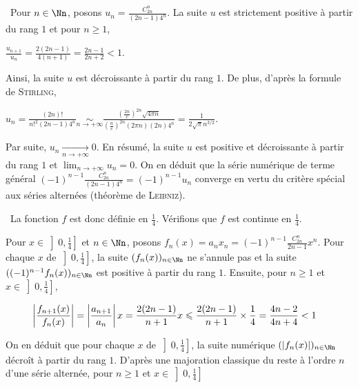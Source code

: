 {{\begin{center}
\shadowbox{
$\forall x\in\left]- \frac{1}{4}, \frac{1}{4}\right[$, $\sum_{n=0}^{+\infty}(-1)^n \frac{C_{2n}^n}{2n-1}x^n=\sqrt{1+4x}$.
}
\end{center}

\textbullet~Pour $n\in\Nn$, posons $u_n= \frac{C_{2n}^n}{(2n-1)4^n}$. La suite $u$ est strictement positive à partir du rang $1$ et pour $n\geqslant1$, 

\begin{center}
$ \frac{u_{n+1}}{u_n}= \frac{2(2n-1)}{4(n+1)}= \frac{2n-1}{2n+2}<1$.
\end{center}

Ainsi, la suite $u$ est décroissante à partir du rang $1$. De plus, d'après la formule de \textsc{Stirling},

\begin{center}
$u_n= \frac{(2n)!}{n!^2(2n-1)4^n}\underset{n\rightarrow+\infty}{\sim} \frac{\left( \frac{2n}{e}\right)^{2n}\sqrt{4\pi n}}{\left( \frac{n}{e}\right)^{2n}(2\pi n)(2n)4^n}= \frac{1}{2\sqrt{\pi}n^{3/2}}$.
\end{center}

Par suite, $u_n\underset{n\rightarrow+\infty}{\rightarrow}0$. En résumé, la suite $u$ est positive et décroissante à partir du rang $1$ et $\lim_{n \rightarrow +\infty}u_n=0$. On en déduit que la série numérique de terme général $(-1)^{n-1} \frac{C_{2n}^n}{(2n-1)4^n}=(-1)^{n-1}u_n$ converge en vertu du critère spécial aux séries alternées (théorème de \textsc{Leibniz}).

\textbullet~La fonction $f$ est donc définie en $ \frac{1}{4}$. Vérifions que $f$ est continue en $ \frac{1}{4}$.

Pour  $x\in\left]0, \frac{1}{4}\right]$ et $n\in\Nn$, posons $f_n(x)=a_nx_n=(-1)^{n-1} \frac{C_{2n}^n}{2n-1}x^n$. Pour chaque $x$ de $\left]0, \frac{1}{4}\right]$, la suite $(f_n(x))_{n\in\Nn}$ ne s'annule pas et la suite $((-1)^{n-1}f_n(x))_{n\in\Nn}$ est positive à partir du rang $1$. Ensuite, pour $n\geqslant1$ et $x\in\left]0, \frac{1}{4}\right]$,

\begin{align*}\ensuremath
\left| \frac{f_{n+1}(x)}{f_n(x)}\right|&=\left| \frac{a_{n+1}}{a_n}\right|x= \frac{2(2n-1)}{n+1}x\leqslant \frac{2(2n-1)}{n+1}\times \frac{1}{4}= \frac{4n-2}{4n+4}<1
\end{align*}

On en déduit que pour chaque $x$ de $\left]0, \frac{1}{4}\right]$, la suite numérique $(|f_n(x)|)_{n\in\Nn}$ décroît à partir du rang $1$. D'après une majoration classique du reste à l'ordre $n$ d'une série alternée, pour $n\geqslant1$ et $x\in\left]0, \frac{1}{4}\right]$

}}
